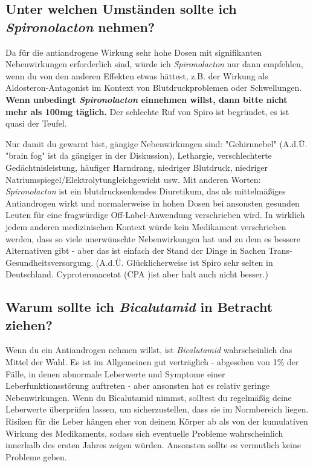 \documentclass{article}
\begin{document}
\subsection{Unter welchen Umständen sollte ich \textit{Spironolacton} nehmen?}

Da für die antiandrogene Wirkung sehr hohe Dosen mit signifikanten Nebenwirkungen erforderlich sind, würde ich \textit{Spironolacton} nur dann empfehlen, wenn du von den anderen Effekten etwas hättest, z.B. der Wirkung als  Aldosteron-Antagonist im Kontext von Blutdruckproblemen oder Schwellungen. \textbf{Wenn unbedingt \textit{Spironolacton} einnehmen willst, dann bitte nicht mehr als 100mg täglich.} Der schlechte Ruf von Spiro ist begründet, es ist quasi der Teufel.

Nur damit du gewarnt bist, gängige Nebenwirkungen sind: "Gehirnnebel" (A.d.Ü. "brain fog" ist da gängiger in der Diskussion), Lethargie, verschlechterte Gedächtnisleistung, häufiger Harndrang, niedriger Blutdruck, niedriger Natriumspiegel/Elektrolytungleichgewicht usw. Mit anderen Worten: \textit{Spironolacton} ist ein blutdrucksenkendes Diuretikum, das als mittelmäßiges Antiandrogen wirkt und normalerweise in hohen Dosen bei ansonsten gesunden Leuten für eine fragwürdige Off-Label-Anwendung verschrieben wird. In wirklich jedem anderen medizinischen Kontext würde kein Medikament verschrieben werden, dass so viele unerwünschte Nebenwirkungen hat und zu dem es bessere Alternativen gibt - aber das ist einfach der Stand der Dinge in Sachen Trans-Gesundheitsversorgung. (A.d.Ü. Glücklicherweise ist Spiro sehr selten in Deutschland. Cyproteronacetat (CPA )ist aber halt auch nicht besser.)

\subsection{Warum sollte ich \textit{Bicalutamid} in Betracht ziehen?}

Wenn du ein Antiandrogen nehmen willst, ist \textit{Bicalutamid} wahrscheinlich das Mittel der Wahl. Es ist im Allgemeinen gut verträglich - abgesehen von 1\% der Fälle, in denen abnormale Leberwerte und Symptome einer Leberfunktionsstörung auftreten - aber ansonsten hat es relativ geringe Nebenwirkungen. Wenn du Bicalutamid nimmst, solltest du regelmäßig deine Leberwerte überprüfen lassen, um sicherzustellen, dass sie im Normbereich liegen. Risiken für die Leber hängen eher von deinem Körper ab als von der kumulativen Wirkung des Medikaments, sodass sich eventuelle Probleme wahrscheinlich innerhalb des ersten Jahres zeigen würden. Ansonsten sollte es vermutlich keine Probleme geben.
\end{document}

